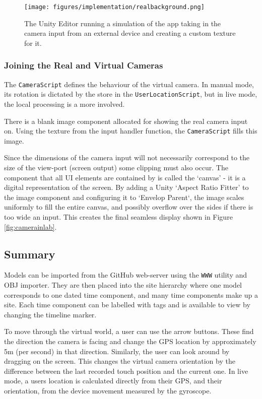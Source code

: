 \documentclass[12pt, a4paper]{article}
\begin{document}
\begin{figure}[h]
    \centering
    \texttt{[image: figures/implementation/realbackground.png]}
        \caption{The Unity Editor running a simulation of the app taking in the camera input from an external device and creating a custom texture for it.}
        \label{fig:camerabackground}
\end{figure}

\subsubsection{Joining the Real and Virtual Cameras}
The \verb|CameraScript| defines the behaviour of the virtual camera. In manual mode, its rotation is dictated by the store in the \verb|UserLocationScript|, but in live mode, the local processing is a more involved.

There is a blank image component allocated for showing the real camera input on. Using the texture from the input handler function, the \verb|CameraScript| fills this image. 

Since the dimensions of the camera input will not necessarily correspond to the size of the view-port (screen output) some clipping must also occur. The component that all UI elements are contained by is called the `canvas' - it is a digital representation of the screen. By adding a Unity `Aspect Ratio Fitter' to the image component and configuring it to `Envelop Parent`, the image scales uniformly to fill the entire canvas, and possibly overflow over the sides if there is too wide an input. This creates the final seamless display shown in Figure \ref{fig:camerainlab}.

\subsection{Summary}
Models can be imported from the GitHub web-server using the \verb|WWW| utility and OBJ importer. They are then placed into the site hierarchy where one model corresponds to one dated time component, and many time components make up a site. Each time component can be labelled with tags and is available to view by changing the timeline marker.

To move through the virtual world, a user can use the arrow buttons. These find the direction the camera is facing and change the GPS location by approximately 5m (per second) in that direction. Similarly, the user can look around by dragging on the screen. This changes the virtual camera orientation by the difference between the last recorded touch position and the current one. In live mode, a users location is calculated directly from their GPS, and their orientation, from the device movement measured by the gyroscope.
\end{document}
